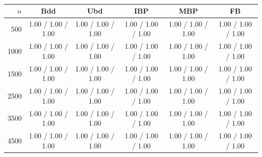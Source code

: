 \begin{table}[ht!]
    \centering
    \small
    \begin{tabular}{r c c c c c}
    \hline
    $n$ & Bdd & Ubd & IBP & MBP & FB \\
    \hline
    500 & 1.00 / 1.00 / 1.00 & 1.00 / 1.00 / 1.00 & 1.00 / 1.00 / 1.00 & 1.00 / 1.00 / 1.00 & 1.00 / 1.00 / 1.00 \\
    1000 & 1.00 / 1.00 / 1.00 & 1.00 / 1.00 / 1.00 & 1.00 / 1.00 / 1.00 & 1.00 / 1.00 / 1.00 & 1.00 / 1.00 / 1.00 \\
    1500 & 1.00 / 1.00 / 1.00 & 1.00 / 1.00 / 1.00 & 1.00 / 1.00 / 1.00 & 1.00 / 1.00 / 1.00 & 1.00 / 1.00 / 1.00 \\
    2500 & 1.00 / 1.00 / 1.00 & 1.00 / 1.00 / 1.00 & 1.00 / 1.00 / 1.00 & 1.00 / 1.00 / 1.00 & 1.00 / 1.00 / 1.00 \\
    3500 & 1.00 / 1.00 / 1.00 & 1.00 / 1.00 / 1.00 & 1.00 / 1.00 / 1.00 & 1.00 / 1.00 / 1.00 & 1.00 / 1.00 / 1.00 \\
    4500 & 1.00 / 1.00 / 1.00 & 1.00 / 1.00 / 1.00 & 1.00 / 1.00 / 1.00 & 1.00 / 1.00 / 1.00 & 1.00 / 1.00 / 1.00 \\
    \hline
    \end{tabular}
    \caption{}
    \label{tab:Exp1_features_Mfix_constant}
\end{table}
